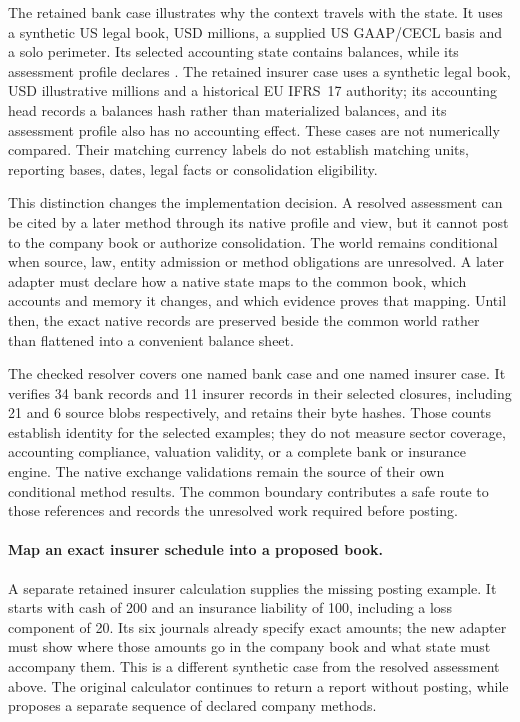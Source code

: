 The retained bank case illustrates why the context travels with the state. It
uses a synthetic US legal book, USD millions, a supplied US GAAP/CECL basis and
a solo perimeter. Its selected accounting state contains balances, while its
assessment profile declares . The retained insurer
case uses a synthetic legal book, USD illustrative millions and a historical
EU IFRS~17 authority; its accounting head records a balances hash rather than
materialized balances, and its assessment profile also has no accounting
effect. These cases are not numerically compared. Their matching currency
labels do not establish matching units, reporting bases, dates, legal facts or
consolidation eligibility.

This distinction changes the implementation decision. A resolved assessment
can be cited by a later method through its native profile and view, but it
cannot post to the company book or authorize consolidation. The world remains
conditional when source, law, entity admission or method obligations are
unresolved. A later adapter must declare how a native state maps to the common
book, which accounts and memory it changes, and which evidence proves that
mapping. Until then, the exact native records are preserved beside the common
world rather than flattened into a convenient balance sheet.

The checked resolver covers one named bank case and one named insurer case.
It verifies 34 bank records and 11 insurer records in their selected closures,
including 21 and 6 source blobs respectively, and retains their byte hashes.
Those counts establish identity for the selected examples; they do not measure
sector coverage, accounting compliance, valuation validity, or a complete bank
or insurance engine. The native exchange validations remain the source of their
own conditional method results. The common boundary contributes a safe route
to those references and records the unresolved work required before posting.



\paragraph{Map an exact insurer schedule into a proposed book.}
A separate retained insurer calculation supplies the missing posting example.
It starts with cash of 200 and an insurance liability of 100, including a loss
component of 20. Its six journals already specify exact amounts; the new
adapter must show where those amounts go in the company book and what state
must accompany them. This is a different synthetic case from the resolved
assessment above. The original calculator continues to return a report without
posting, while  proposes a separate sequence of
declared company methods.

